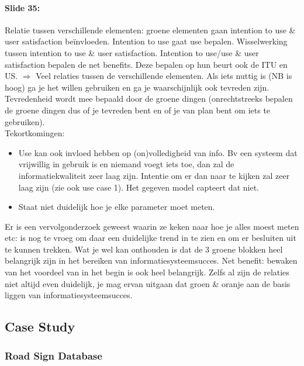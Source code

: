 \documentclass[10pt,a4paper]{report}
\begin{document}
\paragraph{Slide 35:}Relatie tussen verschillende elementen: groene elementen gaan intention to use \& user satisfaction beïnvloeden. 
Intention to use gaat use bepalen. Wisselwerking tussen intention to use \& user satisfaction. Intention to use/use \& user satisfaction bepalen de net benefits. Deze bepalen op hun beurt ook de ITU en US. 
$\Rightarrow$ Veel relaties tussen de verschillende elementen. Als iets nuttig is (NB is hoog) ga je het willen gebruiken en ga je waarschijnlijk ook tevreden zijn. Tevredenheid wordt mee bepaald door de groene dingen (onrechtstreeks bepalen de groene dingen dus of je tevreden bent en of je van plan bent om iets te gebruiken).\\
Tekortkomingen: 
\begin{itemize}
\item Use kan ook invloed hebben op (on)volledigheid van info. Bv een  systeem dat vrijwillig in gebruik is en niemand voegt iets toe, dan zal de informatiekwaliteit zeer laag zijn. Intentie om er dan naar te kijken zal zeer laag zijn (zie ook use case 1). Het gegeven model capteert dat niet.
\item Staat niet duidelijk hoe je elke parameter moet meten.
\end{itemize}
Er is een vervolgonderzoek geweest waarin ze keken naar hoe je alles moest meten etc: is nog te vroeg om daar een duidelijke trend in te zien en om er besluiten uit te kunnen trekken. Wat je wel kan onthouden is dat de 3 groene blokken heel belangrijk zijn in het bereiken van informatiesysteemsucces. Net benefit: bewaken van het voordeel van in het begin is ook heel belangrijk. Zelfs al zijn de relaties niet altijd even duidelijk, je mag ervan uitgaan dat groen \& oranje aan de basis liggen van informatiesysteemsucces.

\subsection{Case Study}
\subsubsection{Road Sign Database}
\end{document}
